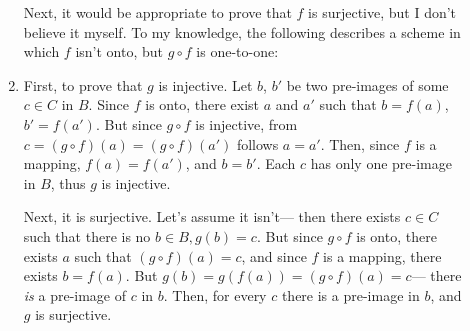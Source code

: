 \begin{description}
\begin{enumerate}
Next, it would be appropriate to prove that $f$ is surjective, but I don't
believe it myself. To my knowledge, the following describes a scheme in which
$f$ isn't onto, but $g \circ f$ is one-to-one:

\begin{center}
\end{center}

\item First, to prove that $g$ is injective. Let $b$, $b'$ be two pre-images of
some $c \in C$ in $B$. Since $f$ is onto, there exist $a$ and $a'$ such that $b
= f(a)$, $b' = f(a')$. But since $g \circ f$ is injective, from $c = (g \circ
f)(a) = (g \circ f)(a')$ follows $a = a'$. Then, since $f$ is a mapping, $f(a)
= f(a')$, and $b = b'$. Each $c$ has only one pre-image in $B$, thus $g$ is
injective.

Next, it is surjective. Let's assume it isn't--- then there exists $c \in C$
such that there is no $b \in B, g(b) = c$. But since $g \circ f$ is onto,
there exists $a$ such that $(g \circ f)(a) = c$, and since $f$ is a mapping,
there exists $b = f(a)$. But $g(b) = g(f(a)) = (g \circ f)(a) = c$--- there
\textit{is} a pre-image of $c$ in $b$. Then, for every $c$ there is a pre-image
in $b$, and $g$ is surjective.

\end{enumerate}
\end{description}

